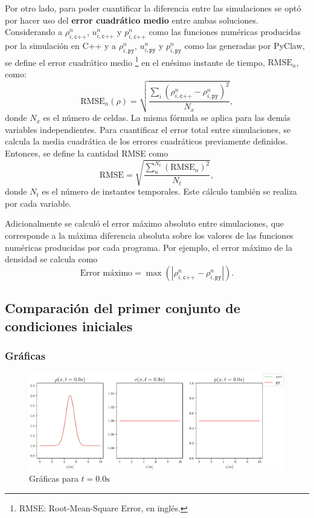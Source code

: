 Por otro lado, para poder cuantificar la diferencia entre las simulaciones se optó por hacer uso del \textbf{error cuadrático medio} entre ambas soluciones. Considerando a $\rho_{i,\texttt{c++}}^{n}$, $u_{i,\texttt{c++}}^{n}$ y $p_{i,\texttt{c++}}^{n}$ como las funciones numéricas producidas por la simulación en C++ y a $\rho_{i,\texttt{py}}^{n}$, $u_{i,\texttt{py}}^{n}$ y $p_{i,\texttt{py}}^{n}$ como las generadas por PyClaw, se define el error cuadrático medio \footnote{RMSE: Root-Mean-Square Error, en inglés.} en el enésimo instante de tiempo, $\text{RMSE}_n$, como:
\begin{equation}
	\text{RMSE}_n(\rho) = \sqrt{\frac{\sum_{i}(\rho_{i,\texttt{c++}}^{n} - \rho_{i,\texttt{py}}^{n})^{2}}{N_x}},
\end{equation}
donde $N_x$ es el número de celdas. La misma fórmula se aplica para las demás variables independientes. Para cuantificar el error total entre simulaciones, se calcula la media cuadrática de los errores cuadráticos previamente definidos. Entonces, se define la cantidad RMSE como
\begin{equation}
	\text{RMSE} = \sqrt{\frac{\sum_{n}^{N_{t}} (\text{RMSE}_{n})^{2}}{N_t}},
\end{equation}
donde $N_t$ es el número de instantes temporales. Este cálculo también se realiza por cada variable. 

Adicionalmente se calculó el error máximo absoluto entre simulaciones, que corresponde a la máxima diferencia absoluta sobre los valores de las funciones numéricas producidas por cada programa. Por ejemplo, el error máximo de la densidad  se calcula como
\begin{equation}
	\text{Error máximo} = \max{(|\rho_{i,\texttt{c++}}^{n} - \rho_{i,\texttt{py}}^{n}|)}.
\end{equation}
\subsection{Comparación del primer conjunto de condiciones iniciales}
\subsubsection{Gráficas}
\begin{figure}[H]
	\centering
	\includegraphics[width=1.1\linewidth]{../euler1D/plots_en_TDG/py_sin_claw/py_gauss199/1.pdf}
	\caption{Gráficas para $t=0.0\unit{\s}$}
\end{figure}

